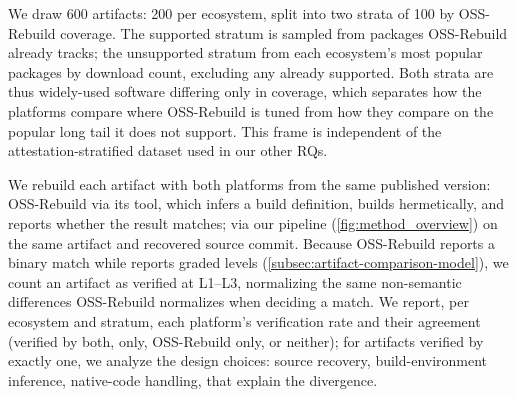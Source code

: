 We draw 600 artifacts: 200 per ecosystem, split into two strata of 100 by OSS-Rebuild coverage. The supported stratum is sampled from packages OSS-Rebuild already tracks; the unsupported stratum from each ecosystem's most popular
packages by download count, excluding any already supported. Both strata are thus widely-used software differing only in coverage, which separates how the platforms compare where OSS-Rebuild is tuned from how they compare on the popular
long tail it does not support. This frame is independent of the attestation-stratified dataset used in our other RQs.

We rebuild each artifact with both platforms from the same published version: OSS-Rebuild via its tool, which infers a build definition, builds hermetically, and reports whether the result matches; \toolname via our pipeline
(\cref{fig:method_overview}) on the same artifact and recovered source commit. Because OSS-Rebuild reports a binary match while \toolname reports graded levels (\cref{subsec:artifact-comparison-model}), we count an \toolname artifact as
verified at L1--L3, normalizing the same non-semantic differences OSS-Rebuild normalizes when deciding a match. We report, per ecosystem and stratum, each platform's verification rate and their agreement (verified by both, \toolname only, OSS-Rebuild only, or neither); for artifacts verified by exactly one, we analyze the design choices: source recovery, build-environment inference,
native-code handling, that explain the divergence.




